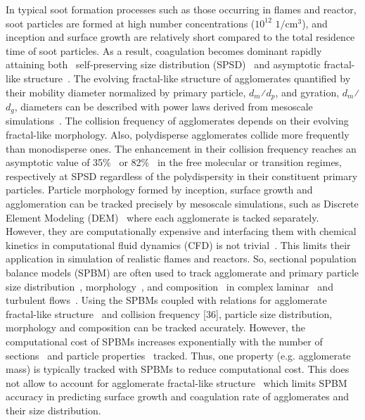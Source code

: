 In typical soot formation processes such as those occurring in flames and reactor, soot particles are formed at high number concentrations ($\mathrm{10^{12}}$ $\mathrm{1/cm^3}$), and inception and surface growth are relatively short compared to the total residence time of soot particles. As a result, coagulation becomes dominant rapidly attaining both~\citep{Goudeli2016}
self-preserving size distribution (SPSD)~\citep{lai1972self} and asymptotic fractal-like structure~\citep{mountain1986simulation}.
The evolving fractal-like structure of agglomerates quantified by their mobility diameter normalized by primary particle, $d_m$⁄$d_p$, and gyration, $d_m$⁄$d_g$, diameters can be described with power laws derived from mesoscale simulations~\citep{Kelesidis2017}. The collision frequency of agglomerates depends on their evolving fractal-like morphology. Also, polydisperse agglomerates collide more frequently than monodisperse ones. The enhancement in their collision frequency reaches an asymptotic value of 35\%~\citep{Goudeli2016} or 82\%~\citep{kelesidis2021self} in the free molecular or transition regimes, respectively at SPSD regardless of the polydispersity in their constituent primary particles. Particle morphology formed by inception, surface growth and agglomeration can be tracked precisely by mesoscale simulations, such as Discrete Element Modeling (DEM)~\citep{Kelesidis2017Flame} where each agglomerate is tacked separately. However, they are computationally expensive and interfacing them with chemical kinetics in computational fluid dynamics (CFD) is not trivial~\citep{kelesidis2021perspective}. This limits their application in simulation of realistic flames and reactors. So, sectional population balance models (SPBM) are often used to track agglomerate and primary particle size distribution~\citep{Xiong1993}, morphology~\citep{park2005aerosol}, and composition~\citep{kholghy2016core} in complex laminar~\citep{kholghy2016core} and turbulent flows~\citep{schiener2019transported}. Using the SPBMs coupled with relations for agglomerate fractal-like structure~\citep{matsoukas1991dynamics} and collision frequency [36], particle size distribution, morphology and composition can be tracked accurately. However, the computational cost of SPBMs increases exponentially with the number of sections~\citep{Xiong1993} and particle properties~\citep{kholghy2016core} tracked. Thus, one property (e.g. agglomerate mass) is typically tracked with SPBMs to reduce computational cost. This does not allow to account for agglomerate fractal-like structure~\citep{smooke2005soot, aubagnac2018soot} which limits SPBM accuracy in predicting surface growth and coagulation rate of agglomerates and their size distribution.

